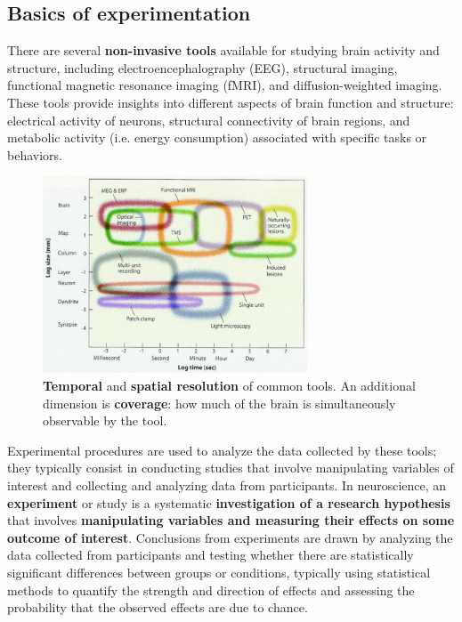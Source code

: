 \subsection{Basics of experimentation}
There are several \textbf{non-invasive tools} available for studying brain activity and structure, including electroencephalography (EEG), structural imaging, functional magnetic resonance imaging (fMRI), and diffusion-weighted imaging. These tools provide insights into different aspects of brain function and structure: electrical activity of neurons, structural connectivity of brain regions, and metabolic activity (i.e. energy consumption) associated with specific tasks or behaviors.

\begin{figure}[ht]
    \centering
  \captionsetup{width=.8\linewidth}
    \includegraphics[width=0.7\textwidth]{images/tools.png}
    \caption{\textbf{Temporal} and \textbf{spatial resolution} of common tools. An additional dimension is \textbf{coverage}: how much of the brain is simultaneously observable by the tool.}
\end{figure}
Experimental procedures are used to analyze the data collected by these tools; they typically consist in conducting studies that involve manipulating variables of interest and collecting and analyzing data from participants. In neuroscience, an \textbf{experiment} or study is a systematic \textbf{investigation of a research hypothesis} that involves \textbf{manipulating variables and measuring their effects on some outcome of interest}.
Conclusions from experiments are drawn by analyzing the data collected from participants and testing whether there are statistically significant differences between groups or conditions, typically using statistical methods to quantify the strength and direction of effects and assessing the probability that the observed effects are due to chance.\\

